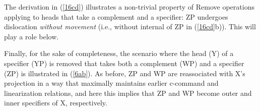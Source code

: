 \documentclass[output=paper]{langsci/langscibook}
\begin{document}
%
%
%

\noindent The derivation in (\ref{16cd}) illustrates a non-trivial property of
Remove operations applying to heads that take a complement and a specifier: ZP
undergoes  dislocation {\it without movement} (i.e., without internal  of
ZP in (\ref{16cd}b)). This will play a role below.

Finally, for the sake of completeness, the scenario where the head (Y) of a
specifier (YP) is removed that takes both a complement (WP) and a specifier
(ZP) is illustrated in (\ref{6ab}).  As before, ZP and WP are reassociated with
X's projection in a way that maximally maintains earlier c-command and
linearization relations, and here this implies that ZP and WP become outer and
inner specifiers of X, respectively.
\end{document}
